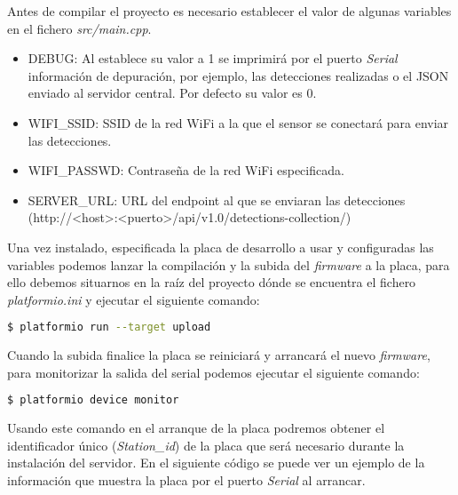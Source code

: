 \documentclass[../proyecto.tex]{subfiles}
\begin{document}
Antes de compilar el proyecto es necesario establecer el valor de algunas variables en el fichero \textit{src/main.cpp}.\\

\begin{itemize}
  \item DEBUG: Al establece su valor a 1 se imprimirá por el puerto \textit{Serial} información de depuración, por ejemplo, las detecciones realizadas o el JSON enviado al servidor central. Por defecto su valor es 0.
  \item WIFI\_SSID: SSID de la red WiFi a la que el sensor se conectará para enviar las detecciones.
  \item WIFI\_PASSWD: Contraseña de la red WiFi especificada.
  \item SERVER\_URL: URL del endpoint al que se enviaran las detecciones
  \linebreak (http://<host>:<puerto>/api/v1.0/detections-collection/)
\end{itemize}

Una vez instalado, especificada la placa de desarrollo a usar y configuradas las variables podemos lanzar la compilación y la subida del \textit{firmware} a la placa, para ello debemos situarnos en la raíz del proyecto dónde se encuentra el fichero \textit{platformio.ini} y ejecutar el siguiente comando:\\

\begin{minipage}{\linewidth}
\begin{lstlisting}[language=bash, caption=Comando compilar y subir el \textit{firmware} a la placa de desarrollo, captionpos=b, frame=single]
$ platformio run --target upload
\end{lstlisting}
\end{minipage}

Cuando la subida finalice la placa se reiniciará y arrancará el nuevo \textit{firmware}, para monitorizar la salida del serial podemos ejecutar el siguiente comando:\\

\begin{minipage}{\linewidth}
\begin{lstlisting}[language=bash, caption=Comando para monitorizar la salida \textit{Serial} de la placa de desarrollo, captionpos=b, frame=single]
$ platformio device monitor
\end{lstlisting}
\end{minipage}

Usando este comando en el arranque de la placa podremos obtener el identificador único (\textit{Station\_id}) de la placa que será necesario durante la instalación del servidor. En el siguiente código se puede ver un ejemplo de la información que muestra la placa por el puerto \textit{Serial} al arrancar.\\
\end{document}
